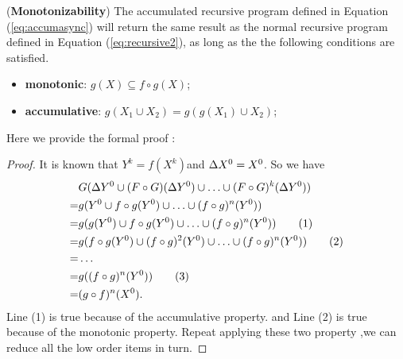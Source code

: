 \begin{theorem}
	\label{th:monotone}
	(\textbf{Monotonizability}) The accumulated recursive program defined in Equation (\ref{eq:accumasync}) will return the same result as the normal recursive program defined in Equation (\ref{eq:recursive2}), as long as the the following conditions are satisfied.
	\begin{itemize}
		\item \textbf{monotonic}: $g(X)\subseteq f\circ g(X)$;
		\item \textbf{accumulative}: $g(X_1\cup X_2)=g(g(X_1)\cup X_2)$;
	\end{itemize}
\end{theorem}
Here we provide the formal proof :
 \begin{proof}
  It is known that $Y^k=f(X^k)$and $\Delta X^0=X^0\\$. So we have
 \begin{align}
 &G(\Delta Y^0\cup (F\circ G)(\Delta Y^0)\cup\ldots\cup (F\circ G)^k(\Delta Y^0))\notag \\
 =&g(Y^0\cup f\circ g(Y^0)\cup \ldots \cup (f\circ g)^n(Y^0))    \notag\\
 =&g(g(Y^0)\cup f\circ g(Y^0)\cup \ldots \cup (f\circ g)^n(Y^0))  \tag{1}\\
 =&g(f\circ g(Y^0)\cup (f\circ g)^2(Y^0)\cup \ldots \cup (f\circ g)^n(Y^0)) \tag{2}\\
 =& \ldots \notag \\
 =&g((f\circ g)^n(Y^0))\tag{3}\\
 =&(g \circ f)^n(X^0).\notag
 \end{align}
  Line (1) is true because of the accumulative property. and Line (2) is true because of the monotonic property.
  Repeat applying these two property ,we can reduce all the low order items in turn.
 \end{proof}

